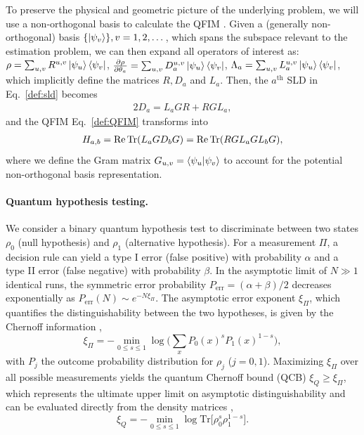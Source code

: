 \documentclass[reprint,amsmath,amssymb,aps,prl,floatfix,groupedaddress,superscriptaddress]{revtex4-2}
\begin{document}
To preserve the physical and geometric picture of the underlying problem, we will use a non-orthogonal basis to calculate the QFIM \cite{genoni2019non,napoli2019towards,fiderer2021general}. Given a (generally non-orthogonal) basis $\{\ket{\psi_v}\}, v = 1,2,\dots$, which spans the subspace relevant to the estimation problem, we can then expand all operators of interest as:
$\rho = \sum_{u,v} R^{u,v} \ket{\psi_u}\bra{\psi_v}$, $\pdv{\rho}{\theta_a} = \sum_{u,v} D_a^{u,v} \ket{\psi_u}\bra{\psi_v}$,
$\Lambda_a =  \sum_{u,v} L_a^{u,v} \ket{\psi_u}\bra{\psi_v}$,
which implicitly define the matrices ${R}, D_a$ and $L_a$. Then, the $a^{\textrm{th}}$ SLD in Eq.~\eqref{def:sld} becomes
\begin{align}
    2 {D}_a = {L}_a{G}{R} + {R}{G}{L}_a,
    \label{eq:sld_nonorthogonal}
\end{align}
and the QFIM Eq.~\eqref{def:QFIM} transforms into
\begin{align}
    H_{a,b} = \Re \Tr (L_a G D_b G) =  \Re \Tr( R G L_a  G L_b G),
    \label{eq:qfi_nonorthogonal}
\end{align}
where we define the Gram matrix $G_{u,v}=\braket{\psi_u}{\psi_v}$ to account for the potential non-orthogonal basis representation.

\paragraph{Quantum hypothesis testing.\label{sec:hypothesistesting}}
We consider a binary quantum hypothesis test to discriminate between two states $\rho_0$ (null hypothesis) and $\rho_1$ (alternative hypothesis). For a  measurement $\Pi$, a decision rule can yield a type I error (false positive) with probability $\alpha$ and a type II error (false negative) with probability $\beta$. In the asymptotic limit of $N \gg 1$ identical runs, the symmetric error probability  $P_{\textrm{err}} = (\alpha + \beta)/2$ decreases exponentially as $P_{\textrm{err}}(N) \sim e^{-N \xi_{\Pi}}$. The asymptotic error exponent $\xi_{\Pi}$, which quantifies the distinguishability between the two hypotheses, is given by the Chernoff information \cite{cover1999elements},
\begin{equation} \label{eq:CCB}
    \xi_{\Pi} = - \min_{0 \leq s \leq 1} \log \Big( \sum_x P_0(x)^s P_1(x)^{1-s} \Big),
\end{equation}
with $P_j$ the outcome probability distribution for $\rho_j$ ($j=0,1$). Maximizing $\xi_{\Pi}$ over all possible measurements yields the quantum Chernoff bound (QCB) $\xi_Q \geq \xi_\Pi$, which represents the ultimate upper limit on asymptotic distinguishability and can be evaluated directly from the density matrices \cite{audenaert2007discriminating},
\begin{equation} \label{eq:QCB}
\xi_Q = - \min_{0 \leq s \leq 1} \log \text{Tr} \big[ \rho_0^s \rho_1^{1-s} \big].
\end{equation}
\end{document}
